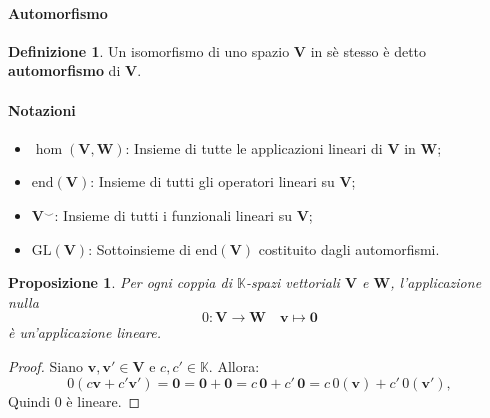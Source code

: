 \documentclass{article}
\theoremstyle{plain}
\newtheorem{prop}[thm]{Proposizione}
\theoremstyle{definition}
\newtheorem{defn}{Definizione}[section]
\theoremstyle{remark}
\begin{document}
\vspace{10pt}

\paragraph{Automorfismo}
\begin{bxthm}
\begin{defn}
    Un isomorfismo di uno spazio $\mathbf{V}$ in sè stesso è detto \textbf{automorfismo} di $\mathbf{V}$.
\end{defn}
\end{bxthm}

\vspace{10pt}

\paragraph{Notazioni}
\begin{itemize}
    \item $\hom(\mathbf{V},\mathbf{W})$: Insieme di tutte le applicazioni lineari di $\mathbf{V}$ in $\mathbf{W}$;
    \item $\mathrm{end}(\mathbf{V})$: Insieme di tutti gli operatori lineari su $\mathbf{V}$;
    \item $\mathbf{V}^\smallsmile$: Insieme di tutti i funzionali lineari su $\mathbf{V}$;
    \item $\mathrm{GL}(\mathbf{V})$: Sottoinsieme di $\mathrm{end}(\mathbf{V})$ costituito dagli automorfismi.
\end{itemize}

\vspace{10pt}

\begin{bxthm}
\begin{prop}
    Per ogni coppia di $\mathbb{K}$-spazi vettoriali $\mathbf{V}$ e $\mathbf{W}$, l'applicazione nulla 
    \[ \mathit{0}:\mathbf{V}\to \mathbf{W}\quad\mathbf{v}\mapsto\mathbf{0} \]
    è un'applicazione lineare.
\end{prop}
\end{bxthm}
\begin{proof}
    Siano $\mathbf{v}, \mathbf{v}' \in \mathbf{V}$ e $c,c' \in \mathbb{K}$. Allora:
    \[
        \mathit{0}(c\mathbf{v} + c'\mathbf{v}') = \mathbf{0} = \mathbf{0} + \mathbf{0} = c\,\mathbf{0} + c'\,\mathbf{0} = c\,\mathit{0}(\mathbf{v}) + c'\,\mathit{0}(\mathbf{v}'),
    \]
    Quindi $\mathit{0}$ è lineare.
\end{proof}
\end{document}
